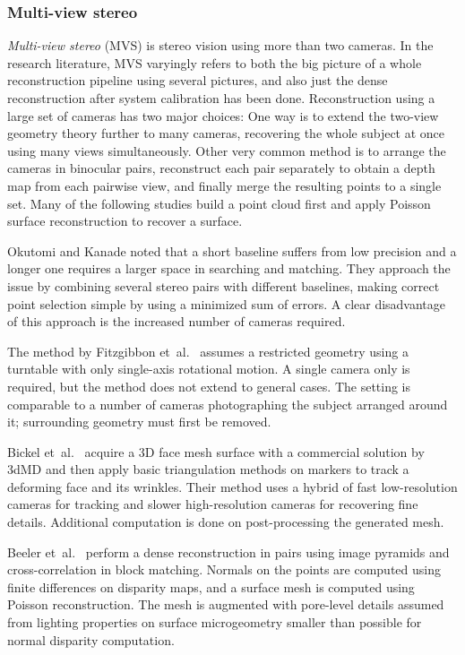 
\subsubsection{Multi-view stereo} %

\emph{Multi-view stereo} (MVS) is stereo vision using more than two cameras.
In the research literature, MVS varyingly refers to both the big picture of a whole reconstruction pipeline using several pictures, and also just the dense reconstruction after system calibration has been done.
Reconstruction using a large set of cameras has two major choices:
One way is to extend the two-view geometry theory further to many cameras, recovering the whole subject at once using many views simultaneously.
Other very common method is to arrange the cameras in binocular pairs, reconstruct each pair separately to obtain a depth map from each pairwise view, and finally merge the resulting points to a single set.
Many of the following studies build a point cloud first and apply Poisson surface reconstruction \cite{kazhdan2006poisson} to recover a surface.

Okutomi and Kanade \cite{okutomi1993multiple} noted that a short baseline suffers from low precision and a longer one requires a larger space in searching and matching.
They approach the issue by combining several stereo pairs with different baselines, making correct point selection simple by using a minimized sum of errors.
A clear disadvantage of this approach is the increased number of cameras required.

The method by Fitzgibbon et~al.\ \cite{fitzgibbon1998automatic} assumes a restricted geometry using a turntable with only single-axis rotational motion.
A single camera only is required, but the method does not extend to general cases.
The setting is comparable to a number of cameras photographing the subject arranged around it; surrounding geometry must first be removed.

Bickel et~al.\ \cite{bickel2007multi} acquire a 3D face mesh surface with a commercial solution by 3dMD \cite{3dmd} and then apply basic triangulation methods on markers to track a deforming face and its wrinkles.
Their method uses a hybrid of fast low-resolution cameras for tracking and slower high-resolution cameras for recovering fine details.
Additional computation is done on post-processing the generated mesh.

Beeler et~al.\ \cite{beeler2010high} perform a dense reconstruction in pairs using image pyramids and cross-correlation in block matching.
Normals on the points are computed using finite differences on disparity maps, and a surface mesh is computed using Poisson reconstruction.
The mesh is augmented with pore-level details assumed from lighting properties on surface microgeometry smaller than possible for normal disparity computation.

